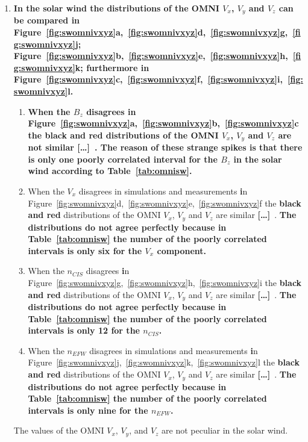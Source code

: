 \documentclass[linenumbers,draft]{agujournal}
\newcommand{\del}{\textbf{[\dots]}\ } %
\begin{document}
\begin{enumerate}
\item \textbf{In the solar wind the distributions of the OMNI $V_{x}$, $V_{y}$ and $V_{z}$ can be compared \textbf{i}n Figure~\ref{fig:swomnivxyz}a,~\ref{fig:swomnivxyz}d,~\ref{fig:swomnivxyz}g,~\ref{fig:swomnivxyz}j; Figure~\ref{fig:swomnivxyz}b,~\ref{fig:swomnivxyz}e,~\ref{fig:swomnivxyz}h,~\ref{fig:swomnivxyz}k; furthermore \textbf{i}n Figure~\ref{fig:swomnivxyz}c,~\ref{fig:swomnivxyz}f,~\ref{fig:swomnivxyz}i,~\ref{fig:swomnivxyz}l.}
\begin{enumerate} 
\item \textbf{When the $B_{z}$ disagrees \textbf{i}n Figure~\ref{fig:swomnivxyz}a,~\ref{fig:swomnivxyz}b,~\ref{fig:swomnivxyz}c the black and red distributions of the OMNI $V_{x}$, $V_{y}$ and $V_{z}$ are not similar \del . The reason of these strange spikes is that there is only one poorly correlated interval for the $B_{z}$ in the solar wind according to Table~\ref{tab:omnisw}.}

\item When the $V_{x}$ disagrees in simulations and measurements \textbf{i}n Figure~\ref{fig:swomnivxyz}d,~\ref{fig:swomnivxyz}e,~\ref{fig:swomnivxyz}f the \textbf{black and red} distributions of the OMNI $V_{x}$, $V_{y}$ and $V_{z}$ are similar \del . \textbf{The distributions do not agree perfectly because in Table~\ref{tab:omnisw} the number of the poorly correlated intervals is only six for the $V_{x}$ component.}
 
\item When the $n_{CIS}$ disagrees \textbf{i}n Figure~\ref{fig:swomnivxyz}g,~\ref{fig:swomnivxyz}h,~\ref{fig:swomnivxyz}i the \textbf{black and red} distributions of the OMNI $V_{x}$, $V_{y}$ and $V_{z}$ are similar \del . \textbf{The distributions do not agree perfectly because in Table~\ref{tab:omnisw} the number of the poorly correlated intervals is only 12 for the $n_{CIS}$.}

\item When the $n_{EFW}$ disagrees in simulations and measurements \textbf{i}n Figure~\ref{fig:swomnivxyz}j,~\ref{fig:swomnivxyz}k,~\ref{fig:swomnivxyz}l the \textbf{black and red} distributions of the OMNI $V_{x}$, $V_{y}$ and $V_{z}$ are similar \del . \textbf{The distributions do not agree perfectly because in Table~\ref{tab:omnisw} the number of the poorly correlated intervals is only nine for the $n_{EFW}$.}
\end{enumerate}
The values of the OMNI $V_{x}$, $V_{y}$, and $V_{z}$ are not peculiar in the solar wind. 
  

\end{enumerate}
\end{document}
